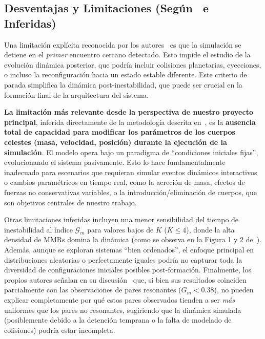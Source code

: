 \subsection{Desventajas y Limitaciones (Según~\cite{Wu2025} e Inferidas)}
Una limitación explícita reconocida por los autores~\cite{Wu2025} es que la simulación se detiene en el \textit{primer} encuentro cercano detectado. Esto impide el estudio de la evolución dinámica posterior, que podría incluir colisiones planetarias, eyecciones, o incluso la reconfiguración hacia un estado estable diferente. Este criterio de parada simplifica la dinámica post-inestabilidad, que puede ser crucial en la formación final de la arquitectura del sistema.

\textbf{La limitación más relevante desde la perspectiva de nuestro proyecto principal}, inferida directamente de la metodología descrita en~\cite{Wu2025}, es la \textbf{ausencia total de capacidad para modificar los parámetros de los cuerpos celestes (masa, velocidad, posición) durante la ejecución de la simulación}. El modelo opera bajo un paradigma de ``condiciones iniciales fijas'', evolucionando el sistema pasivamente. Esto lo hace fundamentalmente inadecuado para escenarios que requieran simular eventos dinámicos interactivos o cambios paramétricos en tiempo real, como la acreción de masa, efectos de fuerzas no conservativas variables, o la introducción/eliminación de cuerpos, que son objetivos centrales de nuestro trabajo.

Otras limitaciones inferidas incluyen una menor sensibilidad del tiempo de inestabilidad al índice $\mathcal{G}_m$ para valores bajos de $K$ ($K \leq 4$), donde la alta densidad de MMRs domina la dinámica (como se observa en la Figura 1 y 2 de~\cite{Wu2025}). Además, aunque se exploran sistemas ``bien ordenados'', el enfoque principal en distribuciones aleatorias o perfectamente iguales podría no capturar toda la diversidad de configuraciones iniciales posibles post-formación. Finalmente, los propios autores señalan en su discusión~\cite{Wu2025} que, si bien sus resultados coinciden parcialmente con las observaciones de pares resonantes ($G_m < 0.38$), no pueden explicar completamente por qué estos pares observados tienden a ser \textit{más} uniformes que los pares no resonantes, sugiriendo que la dinámica simulada (posiblemente debido a la detención temprana o la falta de modelado de colisiones) podría estar incompleta.

